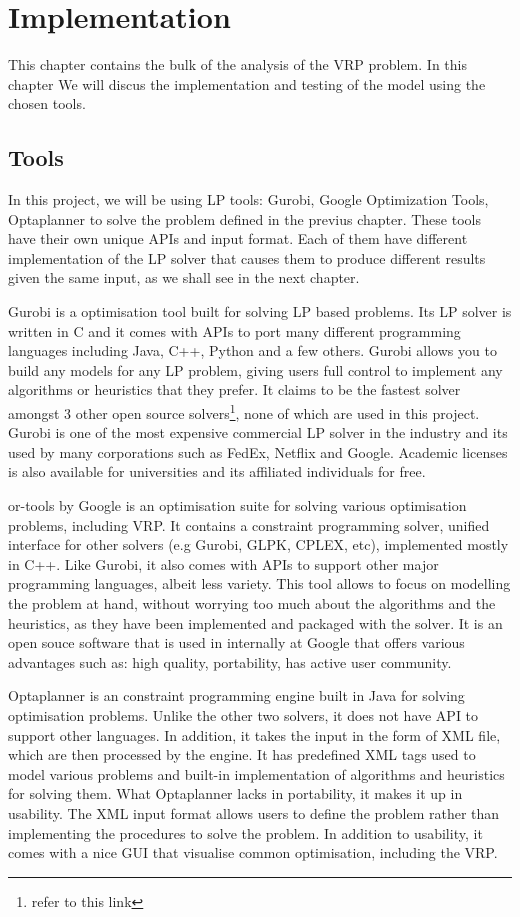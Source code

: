 \chapter{Implementation}

This chapter contains the bulk of the analysis of the VRP problem. In this chapter We will discus the implementation and testing of the model
using the chosen tools.

\section{Tools}
In this project, we will be using LP tools: Gurobi, Google Optimization Tools, Optaplanner to solve the problem
defined in the previus chapter. These tools have their own unique APIs and input format. Each of them
have different implementation of the LP solver that causes them to produce different results given the same input,
as we shall see in the next chapter.

Gurobi is a optimisation tool built for solving LP based problems. Its LP solver is written in C and it comes with
APIs to port many different programming languages including Java, C++, Python and a few others. Gurobi allows you
to build any models for any LP problem, giving users full control to implement any algorithms or heuristics that they
prefer. It claims to be the fastest solver amongst 3 other open source solvers\footnote{refer to
this link}, none of which are used in this project. Gurobi is one of the most expensive commercial LP solver in the industry
and its used by many corporations such as FedEx, Netflix and Google. Academic licenses is also available for universities
and its affiliated individuals for free.

or-tools by Google is an optimisation suite for solving various optimisation problems, including VRP. It contains a constraint programming
solver, unified interface for other solvers (e.g Gurobi, GLPK, CPLEX, etc), implemented mostly in C++. Like Gurobi, it also comes with APIs
to support other major programming languages, albeit less variety. This tool allows to focus on modelling the problem at hand, without worrying
too much about the algorithms and the heuristics, as they have been implemented and packaged with the solver. It is an open souce
software that is used in internally at Google that offers various advantages such as: high quality, portability, has active user community.

Optaplanner is an constraint programming engine built in Java for solving optimisation problems. Unlike the other two solvers, it does not
have API to support other languages. In addition, it takes the input in the form of XML file, which are then processed by the engine. It has
predefined XML tags used to model various problems and built-in implementation of algorithms and heuristics for solving them. What Optaplanner
lacks in portability, it makes it up in usability. The XML input format allows users to define the problem rather than implementing the procedures
to solve the problem. In addition to usability, it comes with a nice GUI that visualise common optimisation, including the VRP.

